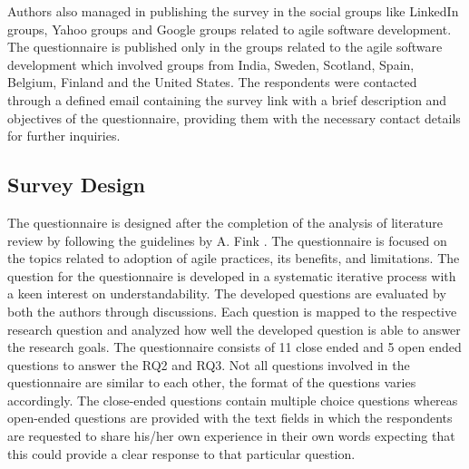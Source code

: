 \documentclass[a4paper,oneside]{bth}
\begin{document}
Authors also managed in publishing the survey in the social groups like LinkedIn groups, Yahoo groups and Google groups related to agile software development. The questionnaire is published only in the groups related to the agile software development which involved groups from India, Sweden, Scotland, Spain, Belgium, Finland and the United States. The respondents were contacted through a defined email containing the survey link with a brief description and objectives of the questionnaire, providing them with the necessary contact details for further inquiries. 
\subsection{Survey Design}
\noindent
The questionnaire is designed after the completion of the analysis of literature review by following the guidelines by A. Fink \cite{fink_how_2003}. The questionnaire is focused on the topics related to adoption of agile practices, its benefits, and limitations. The question for the questionnaire is developed in a systematic iterative process with a keen interest on understandability. The developed questions are evaluated by both the authors through discussions. Each question is mapped to the respective research question and analyzed how well the developed question is able to answer the research goals. The questionnaire consists of 11 close ended and 5 open ended questions to answer the RQ2 and RQ3. Not all questions involved in the questionnaire are similar to each other, the format of the questions varies accordingly. The close-ended questions contain multiple choice questions whereas open-ended questions are provided with the text fields in which the respondents are requested to share his/her own experience in their own words expecting that this could provide a clear response to that particular question.
\end{document}
